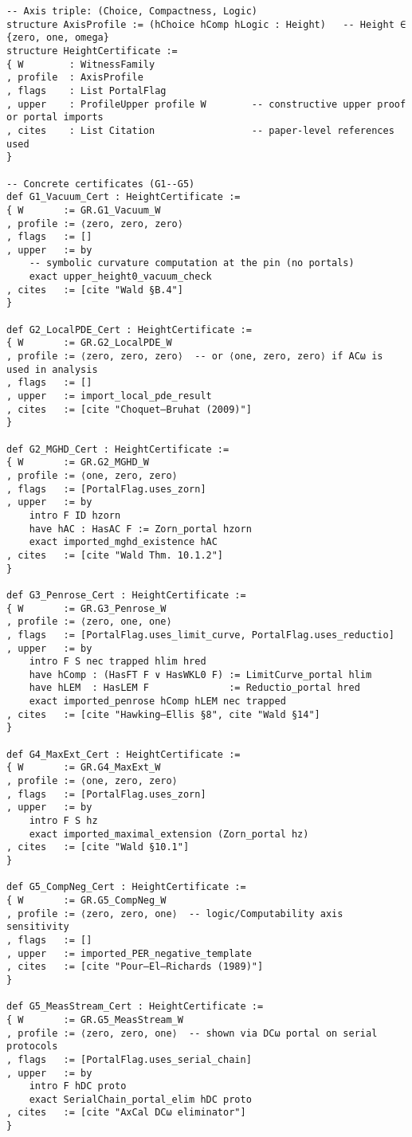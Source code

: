 \documentclass[11pt]{article}
\theoremstyle{definition}
\theoremstyle{remark}
\begin{document}
\begin{verbatim}
-- Axis triple: (Choice, Compactness, Logic)
structure AxisProfile := (hChoice hComp hLogic : Height)   -- Height ∈ {zero, one, omega}
structure HeightCertificate :=
{ W        : WitnessFamily
, profile  : AxisProfile
, flags    : List PortalFlag
, upper    : ProfileUpper profile W        -- constructive upper proof or portal imports
, cites    : List Citation                 -- paper-level references used
}

-- Concrete certificates (G1--G5)
def G1_Vacuum_Cert : HeightCertificate :=
{ W       := GR.G1_Vacuum_W
, profile := ⟨zero, zero, zero⟩
, flags   := []
, upper   := by
    -- symbolic curvature computation at the pin (no portals)
    exact upper_height0_vacuum_check
, cites   := [cite "Wald §B.4"]
}

def G2_LocalPDE_Cert : HeightCertificate :=
{ W       := GR.G2_LocalPDE_W
, profile := ⟨zero, zero, zero⟩  -- or ⟨one, zero, zero⟩ if ACω is used in analysis
, flags   := []
, upper   := import_local_pde_result
, cites   := [cite "Choquet–Bruhat (2009)"]
}

def G2_MGHD_Cert : HeightCertificate :=
{ W       := GR.G2_MGHD_W
, profile := ⟨one, zero, zero⟩
, flags   := [PortalFlag.uses_zorn]
, upper   := by
    intro F ID hzorn
    have hAC : HasAC F := Zorn_portal hzorn
    exact imported_mghd_existence hAC
, cites   := [cite "Wald Thm. 10.1.2"]
}

def G3_Penrose_Cert : HeightCertificate :=
{ W       := GR.G3_Penrose_W
, profile := ⟨zero, one, one⟩
, flags   := [PortalFlag.uses_limit_curve, PortalFlag.uses_reductio]
, upper   := by
    intro F S nec trapped hlim hred
    have hComp : (HasFT F ∨ HasWKL0 F) := LimitCurve_portal hlim
    have hLEM  : HasLEM F              := Reductio_portal hred
    exact imported_penrose hComp hLEM nec trapped
, cites   := [cite "Hawking–Ellis §8", cite "Wald §14"]
}

def G4_MaxExt_Cert : HeightCertificate :=
{ W       := GR.G4_MaxExt_W
, profile := ⟨one, zero, zero⟩
, flags   := [PortalFlag.uses_zorn]
, upper   := by
    intro F S hz
    exact imported_maximal_extension (Zorn_portal hz)
, cites   := [cite "Wald §10.1"]
}

def G5_CompNeg_Cert : HeightCertificate :=
{ W       := GR.G5_CompNeg_W
, profile := ⟨zero, zero, one⟩  -- logic/Computability axis sensitivity
, flags   := []
, upper   := imported_PER_negative_template
, cites   := [cite "Pour–El–Richards (1989)"]
}

def G5_MeasStream_Cert : HeightCertificate :=
{ W       := GR.G5_MeasStream_W
, profile := ⟨zero, zero, one⟩  -- shown via DCω portal on serial protocols
, flags   := [PortalFlag.uses_serial_chain]
, upper   := by
    intro F hDC proto
    exact SerialChain_portal_elim hDC proto
, cites   := [cite "AxCal DCω eliminator"]
}
\end{verbatim}
\end{document}
